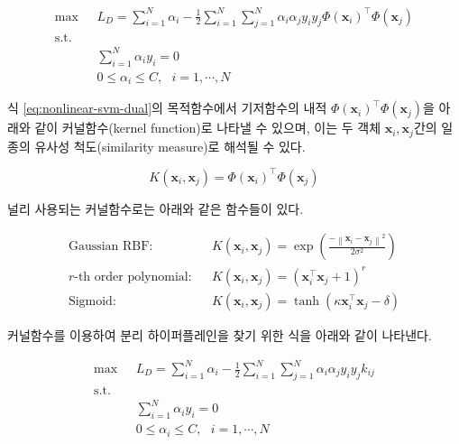 \documentclass[
]{book}
\begin{document}
\begin{equation}
\begin{split}
\max \text{  } & L_D = \sum_{i = 1}^{N} \alpha_i - \frac{1}{2} \sum_{i = 1}^{N} \sum_{j = 1}^{N} \alpha_i \alpha_j y_i y_j \Phi(\mathbf{x}_i)^\top \Phi(\mathbf{x}_j)\\
\text{s.t. } &\\
& \sum_{i = 1}^{N} \alpha_i y_i = 0\\
& 0 \le \alpha_i \le C, \text{  } i = 1, \cdots, N
\end{split}
\label{eq:nonlinear-svm-dual}
\end{equation}

식 \eqref{eq:nonlinear-svm-dual}의 목적함수에서 기저함수의 내적 \(\Phi(\mathbf{x}_i)^\top \Phi(\mathbf{x}_j)\)을 아래와 같이 커널함수(kernel function)로 나타낼 수 있으며, 이는 두 객체 \(\mathbf{x}_i, \mathbf{x}_j\)간의 일종의 유사성 척도(similarity measure)로 해석될 수 있다.

\begin{equation*}
K(\mathbf{x}_i, \mathbf{x}_j) = \Phi(\mathbf{x}_i)^\top \Phi(\mathbf{x}_j)
\end{equation*}

널리 사용되는 커널함수로는 아래와 같은 함수들이 있다.

\begin{eqnarray*}
\text{Gaussian RBF:} & & K(\mathbf{x}_i, \mathbf{x}_j) = \exp \left( \frac{- \left\lVert \mathbf{x}_i - \mathbf{x}_j \right\rVert^2}{2 \sigma^2} \right)\\
\text{$r$-th order polynomial:} & & K(\mathbf{x}_i, \mathbf{x}_j) = \left( \mathbf{x}_i^\top \mathbf{x}_j + 1 \right)^r \\
\text{Sigmoid:} & & K(\mathbf{x}_i, \mathbf{x}_j) = \tanh \left(\kappa \mathbf{x}_i^\top \mathbf{x}_j - \delta \right)
\end{eqnarray*}

커널함수를 이용하여 분리 하이퍼플레인을 찾기 위한 식을 아래와 같이 나타낸다.

\begin{equation}
\begin{split}
\max \text{  } & L_D = \sum_{i = 1}^{N} \alpha_i - \frac{1}{2} \sum_{i = 1}^{N} \sum_{j = 1}^{N} \alpha_i \alpha_j y_i y_j k_{ij}\\
\text{s.t. } &\\
& \sum_{i = 1}^{N} \alpha_i y_i = 0\\
& 0 \le \alpha_i \le C, \text{  } i = 1, \cdots, N
\end{split}
\label{eq:nonlinear-svm-dual-kernel}
\end{equation}
\end{document}
